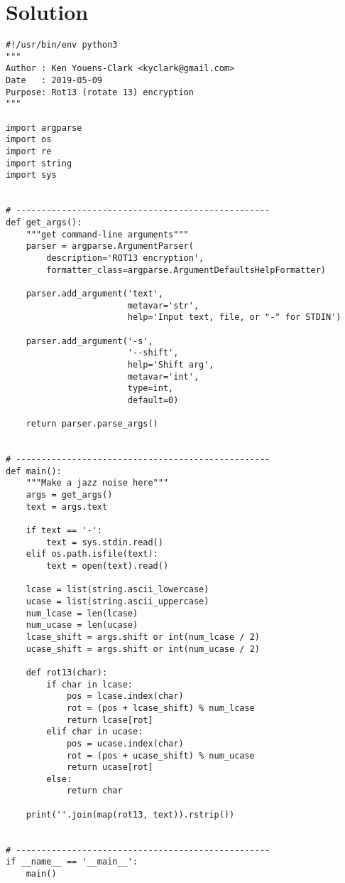 \documentclass[]{article}
\begin{document}
\pagebreak

\hypertarget{solution-26}{%
\section{Solution}\label{solution-26}}

\begin{verbatim}
#!/usr/bin/env python3
"""
Author : Ken Youens-Clark <kyclark@gmail.com>
Date   : 2019-05-09
Purpose: Rot13 (rotate 13) encryption
"""

import argparse
import os
import re
import string
import sys


# --------------------------------------------------
def get_args():
    """get command-line arguments"""
    parser = argparse.ArgumentParser(
        description='ROT13 encryption',
        formatter_class=argparse.ArgumentDefaultsHelpFormatter)

    parser.add_argument('text',
                        metavar='str',
                        help='Input text, file, or "-" for STDIN')

    parser.add_argument('-s',
                        '--shift',
                        help='Shift arg',
                        metavar='int',
                        type=int,
                        default=0)

    return parser.parse_args()


# --------------------------------------------------
def main():
    """Make a jazz noise here"""
    args = get_args()
    text = args.text

    if text == '-':
        text = sys.stdin.read()
    elif os.path.isfile(text):
        text = open(text).read()

    lcase = list(string.ascii_lowercase)
    ucase = list(string.ascii_uppercase)
    num_lcase = len(lcase)
    num_ucase = len(ucase)
    lcase_shift = args.shift or int(num_lcase / 2)
    ucase_shift = args.shift or int(num_ucase / 2)

    def rot13(char):
        if char in lcase:
            pos = lcase.index(char)
            rot = (pos + lcase_shift) % num_lcase
            return lcase[rot]
        elif char in ucase:
            pos = ucase.index(char)
            rot = (pos + ucase_shift) % num_ucase
            return ucase[rot]
        else:
            return char

    print(''.join(map(rot13, text)).rstrip())


# --------------------------------------------------
if __name__ == '__main__':
    main()
\end{verbatim}

\pagebreak
\end{document}
